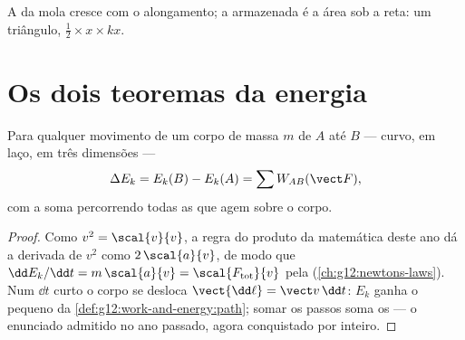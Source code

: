 \begin{omfigure}

{\small A  da mola cresce com o alongamento; a  armazenada é a área sob a
reta: um triângulo, $\tfrac12 \times x \times kx$.}
\end{omfigure}

\section{Os dois teoremas da energia}

\begin{theorem}\label{thm:g12:work-and-energy:ketheorem}
Para qualquer movimento de um corpo de massa $m$ de $A$ até $B$ --- curvo, em laço, em
três dimensões ---
\[
\Delta E_k = E_k(B) - E_k(A) = \sum W_{AB}(\vect F),
\]
com a soma percorrendo todas as  que agem sobre o corpo.
\end{theorem}

\begin{proof}
Como $v^2 = \scal{v}{v}$, a regra do produto da matemática deste ano dá a derivada de
$v^2$ como $2\,\scal{a}{v}$, de modo que
$\dd E_k/\dd t = m\,\scal{a}{v} = \scal{F_{\text{tot}}}{v}$ pela 
(\cref{ch:g12:newtons-laws}). Num $\dd t$ curto o corpo se desloca
$\vect{\dd\ell} = \vect v\,\dd t$: $E_k$ ganha o pequeno  da
\cref{def:g12:work-and-energy:path}; somar os passos soma os  --- o enunciado
admitido no ano passado, agora conquistado por inteiro.
\end{proof}


